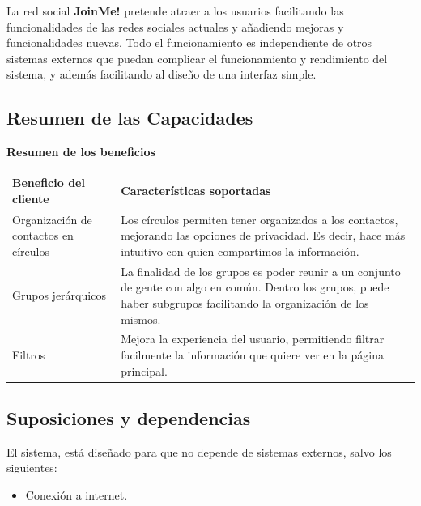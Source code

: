 \documentclass[12pt, a4paper, titlepage]{article}
\begin{document}
La red social \textbf{JoinMe!} pretende atraer a los usuarios facilitando las funcionalidades de las redes sociales actuales y añadiendo mejoras y funcionalidades nuevas. Todo el funcionamiento es independiente de otros sistemas externos que puedan complicar el funcionamiento y rendimiento del sistema, y además facilitando al diseño de una interfaz simple.

\subsection{Resumen de las Capacidades}



\begin{center}
\textbf{Resumen de los beneficios}
	\begin{tabular}{| p{7cm} | p{8cm} | }
		\hline
		\textbf{Beneficio del cliente} & \textbf{Características soportadas} \\ \hline
		Organización de contactos en círculos & Los círculos permiten tener organizados a los contactos, mejorando las opciones de privacidad. Es decir, hace más intuitivo con quien compartimos la información. \\ \hline
		Grupos jerárquicos & La finalidad de los
grupos es poder reunir a un conjunto de gente con algo en común. Dentro los grupos, puede haber subgrupos facilitando la organización de los mismos.	\\ \hline
		Filtros & Mejora la experiencia del usuario, permitiendo filtrar facilmente la información que quiere ver en la página principal. \\ \hline
	\end{tabular}
\end{center}

\subsection{Suposiciones y dependencias}\label{cap:Dependencias}

El sistema, está diseñado para que no depende de sistemas externos, salvo los siguientes:

\begin{itemize}
\item Conexión a internet.
\end{itemize}
\end{document}
